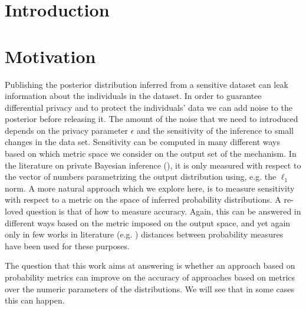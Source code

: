\documentclass[sigconf]{acmart}
\begin{document}

\maketitle

\section{Introduction}
\label{sec_intro}


\section{Motivation}
\label{sec_intro}
Publishing the posterior distribution inferred from a sensitive dataset can
leak information about the individuals in the dataset.
In order to guarantee differential privacy and to protect the
individuals' data we can add noise to the posterior before releasing it.
The amount of the noise that we need to  introduced
depends on the privacy parameter $\epsilon$ and the sensitivity of the inference to
small changes in the data set. 
Sensitivity can be computed in many different ways based on which metric space
we consider on the output set of the mechanism. In the literature on private Bayesian
inference (\cite{zhang2016differential,xiao2012bayesian}), it is only measured with
respect to the vector of numbers parametrizing the output distribution using, e.g. the $\ell_1$ norm.
A more natural approach which we explore here, is to measure sensitivity with respect to a metric on the space of inferred probability distributions.
A re-loved question is that of how to measure accuracy. Again,
this can be answered in different ways based on the metric imposed on the output space, and yet again
only in few works in literature (e.g. \cite{zhang2016differential})
distances between probability measures have been used for these purposes.


The question that this work aims at answering is whether
an approach based on probability metrics can improve on the accuracy of approaches based on metrics over
the numeric parameters of the distributions. 
We will see that in some cases this can happen.
\end{document}
